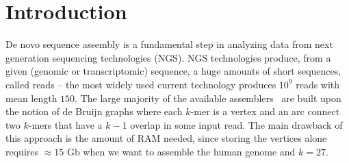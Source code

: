 \documentclass[runningheads,envcountsame,a4paper]{llncs}
\begin{document}
\begin{comment}
\section*{Legenda di supporto per la correzione}
\begin{itemize}
\item $n$: cardinality of the collection $R$
\item $\alpha$: extension string between overlapping reads
\item $w$: number of extensions of a BWT interval with some $\sigma$
\item \emph{length} of a $Q$-interval: length of $Q$
\item \emph{width} of a $Q$-interval $[b,e)$: difference $(e-b)$
\item $\$$-width $w_{\$}$: width of the $Q'\$$-interval inside a $Q'$-interval that is a prefix-interval (old \emph{dimension})
\item \emph{length} of an extension pair: $|S|$ + $|E|$ + $1$ (the old \emph{dimension})
\item $\mathcal{P}$: list of the prefix-intervals computed at each iteration (the old $\mathcal{T}$)
\item $C(\sigma)$: FM-index function (the old $C(\sigma, R)$)
\item $Occ(\sigma, i)$: FM-index function (the old $Occ(\sigma, i, R)$)
\item prefix-interval: $rev(Q)$-interval (on $B'$) representing a string $Q$ occurring as a prefix (the old $P$-interval denotes in this framework an interval representing a string $P$)
\end{itemize}
\end{comment}

\section{Introduction}
De novo sequence assembly is a fundamental step
in analyzing data from next generation sequencing technologies (NGS).
NGS technologies produce, from a given (genomic or transcriptomic) sequence, a huge amounts
of short sequences, called reads -- the most widely used current technology
produces $10^{9}$ reads with mean length $150$.
The large majority of the available
assemblers~\cite{Zerbino2008,Simpson2009,Peng2010,bankevich2012spades} are built
upon the notion of de Bruijn graphs where each $k$-mer is a vertex and an arc
connect two $k$-mers that have a $k-1$ overlap in some input read.
The main drawback of this approach is the amount of RAM needed, since storing
the vertices alone requires $\approx 15$ Gb when we want to assemble the human genome
and $k=27$.
\end{document}
